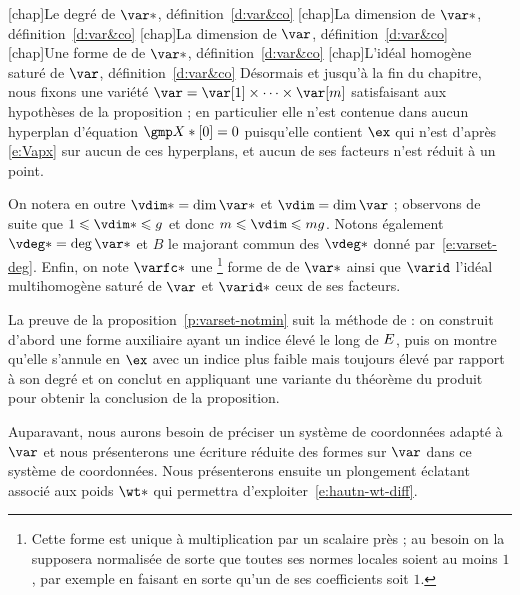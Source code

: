 \begin{nota} \label{n:var&co}
  \nomuse {}
  \nomuse{\vdeg*}[chap]{Le degré de \( \var* \), définition~\ref{d:var&co}}
  \nomuse{\vdim*}[chap]{La dimension de \( \var* \),
    définition~\ref{d:var&co}}
  \nomuse{\vdim }[chap]{La dimension de \( \var \), définition~\ref{d:var&co}}
  \nomuse{\varfc*}[chap]{Une forme de  de \( \var* \),
    définition~\ref{d:var&co}}
  \nomuse{\varid}[chap]{L'idéal homogène saturé de \( \var \),
    définition~\ref{d:var&co}}
  Désormais et jusqu'à la fin du chapitre, nous fixons une variété
  \( \var = \var[1] \times \dots \times \var[\puiss] \) satisfaisant aux
  hypothèses de la proposition ; en particulier elle n'est contenue dans aucun
  hyperplan d'équation \( \vmp*[0] = 0 \) puisqu'elle contient
  \( \ex \) qui n'est d'après \eqref{e:Vapx} sur aucun de ces hyperplans, et
  aucun de ses facteurs n'est réduit à un point.

  On notera en outre \( \vdim* = \dim \var* \) et \( \vdim = \dim \var \) ;
  observons de suite que \( 1 \le \vdim* \le \genre \) et donc \( \puiss \le
    \vdim \le \puiss\genre \). Notons également
  \( \vdeg* = \deg \var* \) et \( B \) le majorant commun des \( \vdeg* \)
  donné par~\eqref{e:varset-deg}. Enfin, on note \( \varfc* \) une
  \footnote{\label{fn:varfc}Cette forme est unique à multiplication par un
    scalaire près ; au besoin on la supposera normalisée de sorte que toutes
    ses normes locales soient au moins \( 1 \), par exemple en faisant en
    sorte qu'un de ses coefficients soit \( 1 \).}
  forme de  de \( \var* \) ainsi que \( \varid \) l'idéal
  multihomogène saturé de \( \var \) et \( \varid* \) ceux de ses facteurs.
\end{nota}

La preuve de la proposition~\ref{p:varset-notmin} suit la méthode de
\TS : on construit d'abord une forme auxiliaire ayant un indice élevé le long
de \( E \), puis on montre qu'elle s'annule en \( \ex \) avec un indice
plus faible mais toujours élevé par rapport à son degré et on conclut en
appliquant une variante du théorème du produit pour obtenir la conclusion de
la proposition.

Auparavant, nous aurons besoin de préciser un système de coordonnées adapté à
\( \var \) et nous présenterons une écriture réduite des formes sur \( \var \)
dans ce système de coordonnées. Nous présenterons ensuite un plongement
éclatant associé aux poids \( \wt* \) qui permettra
d'exploiter~\eqref{e:hautn-wt-diff}.


